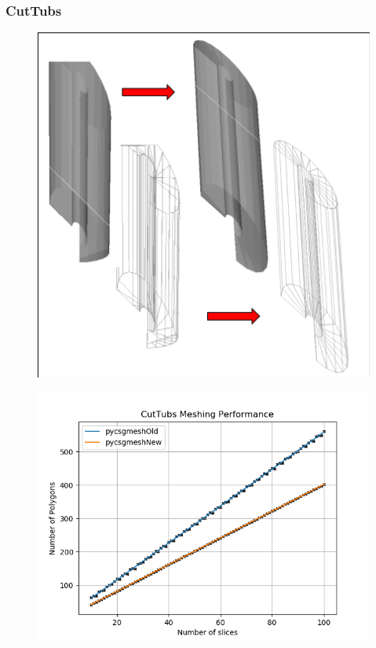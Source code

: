 \documentclass[12pt,a4paper]{article}
\begin{document}
\subsubsection{CutTubs}

\begin{figure}[h!]
\centering
\begin{minipage}{.2\textwidth}
  \centering
  \includegraphics[height=1\linewidth]{Images//Meshes//CutTubs.png}
  \label{fig:test1}
\end{minipage}%
\begin{minipage}{.3\textwidth}
  \centering
  \includegraphics[scale=0.35]{Images//Quad_fits//CutTubs_quad.png}
  \label{fig:test2}
\end{minipage}%
\end{figure}
\end{document}
